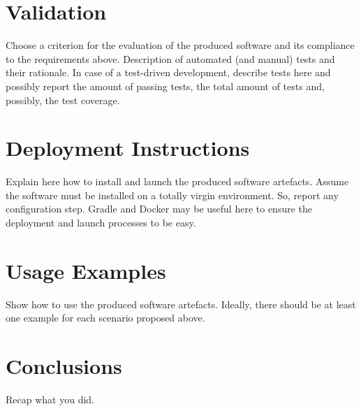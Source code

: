 \chapter{Validation}
Choose a criterion for the evaluation of the produced software and its compliance
to the requirements above. Description of automated (and manual) tests and their
rationale. In case of a test-driven development, describe tests here and possibly report
the amount of passing tests, the total amount of tests and, possibly, the test coverage.
\chapter{Deployment Instructions}
Explain here how to install and launch the produced software artefacts. Assume the
software must be installed on a totally virgin environment. So, report any configuration
step. Gradle and Docker may be useful here to ensure the deployment and launch
processes to be easy.
\chapter{Usage Examples}
Show how to use the produced software artefacts. Ideally, there should be at least one
example for each scenario proposed above.
\chapter{Conclusions}
Recap what you did.